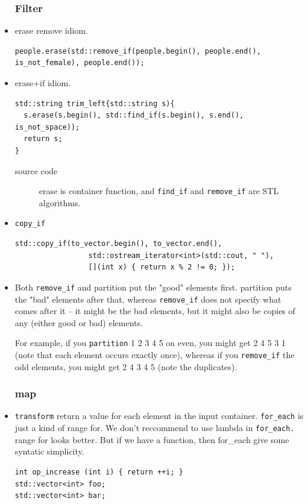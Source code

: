 \documentclass[a4paper,11pt,twoside]{book}
\begin{document}
\begin{itemize}
\subsubsection{Filter}
	\item erase remove idiom.
\begin{lstlisting}
people.erase(std::remove_if(people.begin(), people.end(), is_not_female), people.end());
\end{lstlisting}

	\item erase+if idiom.
\begin{lstlisting}
std::string trim_left{std::string s){
  s.erase(s.begin(), std::find_if(s.begin(), s.end(), is_not_space));
  return s;
}
\end{lstlisting}

\begin{description}
		\item[source code] erase is container function, and \texttt{find\_if} and \texttt{remove\_if} are STL algorithms. 
\end{description}

	\item \texttt{copy\_if}
\begin{lstlisting}
std::copy_if(to_vector.begin(), to_vector.end(),
                 std::ostream_iterator<int>(std::cout, " "),
                 [](int x) { return x % 2 != 0; });
\end{lstlisting}
	
	\item  Both \texttt{remove\_if} and partition put the "good" elements first. partition puts the "bad" elements after that, whereas \texttt{remove\_if} does not specify what comes after it -- it might be the bad elements, but it might also be copies of any (either good or bad) elements.
	
	For example, if you \texttt{partition} 1 2 3 4 5 on even, you might get 2 4 5 3 1 (note that each element occurs exactly once), whereas if you \texttt{remove\_if} the odd elements, you might get 2 4 3 4 5 (note the duplicates).
	
\subsubsection{map}

	\item \texttt{transform} return a value for each element in the input container. \texttt{for\_each} is just a kind of range for. We don't reccommend to use lambda in \texttt{for\_each.}  range for looks better.  But if we have a function, then for\_each give some syntatic simplicity. 
\begin{lstlisting}
int op_increase (int i) { return ++i; }
std::vector<int> foo;
std::vector<int> bar;


\end{lstlisting}
\end{itemize}
\end{document}
